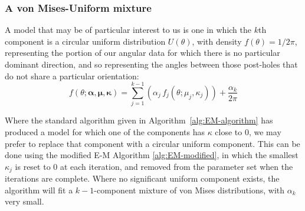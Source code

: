 \documentclass[../../ArchStats.tex]{subfiles}
\begin{document}
\subsubsection{A von Mises-Uniform mixture}
A model that may be of particular interest to us is one in which the $k$th component is a circular uniform distribution $U(\theta)$, with density $f(\theta) = 1/2\pi$, representing the portion of our angular data for which there is no particular dominant direction, and so representing the angles between those post-holes that do not share a particular orientation:
\begin{equation}
f(\theta; \boldsymbol{\alpha, \mu, \kappa}) = \sum_{j=1}^{k-1} \left(\alpha_j \, f_j(\theta; \mu_j, \kappa_j)\right) + \frac{\alpha_k}{2\pi}
\end{equation}


Where the standard algorithm given in Algorithm~\ref{alg:EM-algorithm} has produced a model for which one of the components has $\kappa$ close to 0, we may prefer to replace that component with a circular uniform component. This can be done using the modified E-M Algorithm \ref{alg:EM-modified}, in which the smallest $\kappa_j$ is reset to 0 at each iteration, and removed from the parameter set when the iterations are complete. Where no significant uniform component exists, the algorithm will fit a $k-1$-component mixture of von Mises distributions, with $\alpha_k$ very small.
\end{document}
